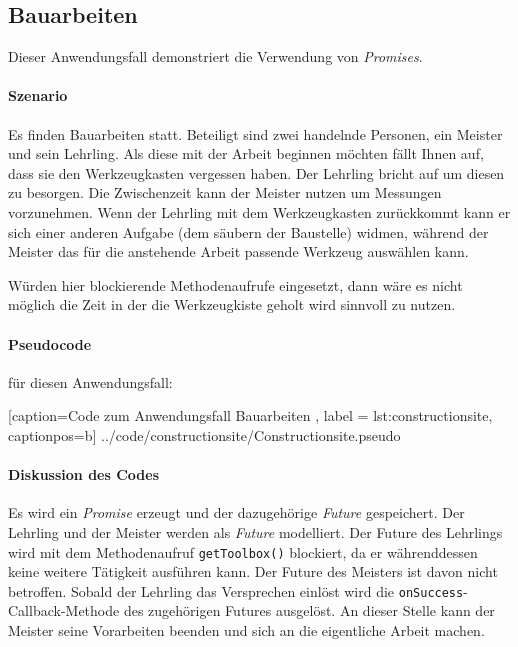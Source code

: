 \subsection{Bauarbeiten}

Dieser Anwendungsfall demonstriert die Verwendung von \emph{Promises}.

\paragraph{Szenario}

Es finden Bauarbeiten statt. Beteiligt sind zwei handelnde Personen,
ein Meister und sein Lehrling. Als diese mit der Arbeit beginnen möchten
fällt Ihnen auf, dass sie den Werkzeugkasten vergessen haben. Der
Lehrling bricht auf um diesen zu besorgen. Die Zwischenzeit kann
der Meister nutzen um Messungen vorzunehmen. Wenn der Lehrling mit
dem Werkzeugkasten zurückkommt kann er sich einer anderen Aufgabe
(dem säubern der Baustelle) widmen, während der Meister das für die
anstehende Arbeit passende Werkzeug auswählen kann.

Würden hier blockierende Methodenaufrufe eingesetzt, dann wäre es nicht
möglich die Zeit in der die Werkzeugkiste geholt wird sinnvoll zu
nutzen.

\paragraph{Pseudocode} für diesen Anwendungsfall:


    [caption={Code zum Anwendungsfall \glqq Bauarbeiten\grqq{} },
       label = lst:constructionsite,
       captionpos=b]
 {../code/constructionsite/Constructionsite.pseudo}

\paragraph{Diskussion des Codes}

Es wird ein \emph{Promise} erzeugt und der dazugehörige \emph{Future}
gespeichert. Der Lehrling und der Meister werden als \emph{Future}
modelliert. Der Future des Lehrlings wird mit dem Methodenaufruf
\texttt{getToolbox()} blockiert, da er währenddessen keine weitere
Tätigkeit ausführen kann. Der Future des Meisters ist davon nicht
betroffen. Sobald der Lehrling das Versprechen einlöst wird die
\texttt{onSuccess}-Callback-Methode des zugehörigen Futures ausgelöst.
An dieser Stelle kann der Meister seine Vorarbeiten beenden und sich
an die eigentliche Arbeit machen.

